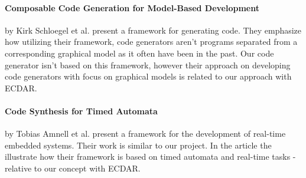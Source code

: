 \paragraph{Composable Code Generation for Model-Based Development}
by Kirk Schloegel et al. present a framework for generating
code\cite{composable-code-generation}. They emphasize how utilizing their
framework, code generators aren't programs separated from a corresponding
graphical model as it often have been in the past. Our code generator isn't
based on this framework, however their approach on developing code generators
with focus on graphical models is related to our approach with ECDAR.

\paragraph{Code Synthesis for Timed Automata}
by Tobias Amnell et al. present a framework for the development of real-time
embedded systems\cite{Amnell:2002:CST:779110.779112}. Their work is similar to
our project. In the article the illustrate how their framework is based on timed
automata and real-time tasks - relative to our concept with ECDAR.
